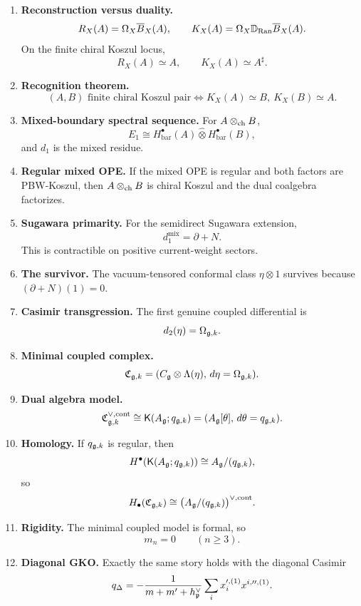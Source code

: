 \begin{enumerate}[label=\textup{(\arabic*)},leftmargin=2.2em]
\item \textbf{Reconstruction versus duality.}
\[
R_X(A)=\Omega_X\overline{B}_X(A),\qquad K_X(A)=\Omega_X\mathbb D_{\operatorname{Ran}}\overline{B}_X(A).
\]
On the finite chiral Koszul locus,
\[
R_X(A)\simeq A,\qquad K_X(A)\simeq A^\sharp.
\]

\item \textbf{Recognition theorem.}
\[
(A,B)\text{ finite chiral Koszul pair}
\iff
K_X(A)\simeq B,\ K_X(B)\simeq A.
\]

\item \textbf{Mixed-boundary spectral sequence.}
For \(A\otimes_{\mathrm{ch}} B\),
\[
E_1 \cong H^\bullet_{\mathrm{bar}}(A)\widehat\otimes H^\bullet_{\mathrm{bar}}(B),
\]
and \(d_1\) is the mixed residue.

\item \textbf{Regular mixed OPE.}
If the mixed OPE is regular and both factors are PBW-Koszul, then \(A\otimes_{\mathrm{ch}} B\) is chiral Koszul and the dual coalgebra factorizes.

\item \textbf{Sugawara primarity.}
For the semidirect Sugawara extension,
\[
d_1^{\mathrm{mix}}=\partial+N.
\]
This is contractible on positive current-weight sectors.

\item \textbf{The survivor.}
The vacuum-tensored conformal class \(\eta\otimes 1\) survives because \((\partial+N)(1)=0\).

\item \textbf{Casimir transgression.}
The first genuine coupled differential is
\[
d_2(\eta)=\Omega_{\mathfrak g,k}.
\]

\item \textbf{Minimal coupled complex.}
\[
\mathfrak C_{\mathfrak g,k}=(C_{\mathfrak g}\otimes \Lambda(\eta),\,d\eta=\Omega_{\mathfrak g,k}).
\]

\item \textbf{Dual algebra model.}
\[
\mathfrak C_{\mathfrak g,k}^{\vee,\mathrm{cont}}\cong \mathsf K(A_{\mathfrak g};q_{\mathfrak g,k})=(A_{\mathfrak g}[\theta],\,d\theta=q_{\mathfrak g,k}).
\]

\item \textbf{Homology.}
If \(q_{\mathfrak g,k}\) is regular, then
\[
H^\bullet(\mathsf K(A_{\mathfrak g};q_{\mathfrak g,k}))\cong A_{\mathfrak g}/(q_{\mathfrak g,k}),
\]
so
\[
H_\bullet(\mathfrak C_{\mathfrak g,k})\cong \bigl(A_{\mathfrak g}/(q_{\mathfrak g,k})\bigr)^{\vee,\mathrm{cont}}.
\]

\item \textbf{Rigidity.}
The minimal coupled model is formal, so
\[
m_n=0 \qquad (n\ge 3).
\]

\item \textbf{Diagonal GKO.}
Exactly the same story holds with the diagonal Casimir
\[
q_{\Delta}=
-\frac{1}{m+m'+h^\vee_{\mathfrak p}}\sum_i x_i^{\prime,(1)}x^{i,\prime\prime,(1)}.
\]
\end{enumerate}

